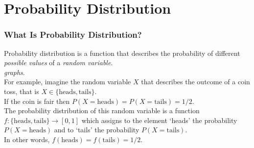 \documentclass[aspectratio=169,11pt,usenames,dvipsnames]{beamer}
\begin{document}
%
%
%

\section{Probability Distribution}

\begin{frame}
 \frametitle{What Is Probability Distribution?}
 \alert{Probability distribution} is a function that describes the probability
 of different \emph{possible values} of a \emph{random variable}.\\ \pause
 \emph{graphs}.\\ \pause
 For example, imagine the random variable $X$ that describes the outcome of a
 coin toss, that is $X \in \{\text{heads},\text{tails}\}$. \\ \pause
 If the coin is fair then $P(X = \text{heads}) = P(X = \text{tails}) = 1 / 2$.\\
 \pause
 The \alert{probability distribution} of this random variable is a function
 $f:\{\text{heads},\text{tails}\} \to [0,1]$ which assigns to the element
 `heads' the probability $P(X = \text{heads})$ and to `tails' the probability
 $P(X = \text{tails})$.\\ \pause
 In other words, $f(\text{heads}) = f(\text{tails}) = 1 / 2$.
\end{frame}
\end{document}
